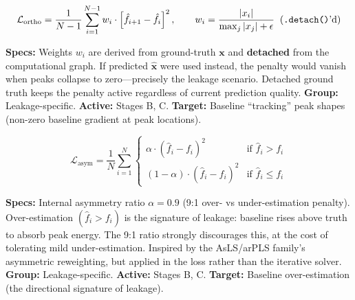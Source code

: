 \documentclass[11pt, letterpaper]{article}
\begin{document}
\vspace{0.3em}

\begin{questionbox}
\normalfont
$$
\mathcal{L}_{\text{ortho}} = \frac{1}{N-1}\sum_{i=1}^{N-1} w_i \cdot \left[\hat{f}_{i+1} - \hat{f}_i\right]^2, \qquad
w_i = \frac{|x_i|}{\max_j |x_j| + \epsilon} \;\;\text{(\texttt{.detach()}'d)}
$$
\end{questionbox}
\begin{answerbox}
\textbf{Specs:} Weights $w_i$ are derived from ground-truth $\mathbf{x}$ and \textbf{detached} from the
computational graph.  If predicted $\hat{\mathbf{x}}$ were used instead, the penalty would vanish when
peaks collapse to zero---precisely the leakage scenario.  Detached ground truth keeps the penalty active
regardless of current prediction quality.
\textbf{Group:} Leakage-specific.  \textbf{Active:} Stages B, C.
\textbf{Target:} Baseline ``tracking'' peak shapes (non-zero baseline gradient at peak locations).
\end{answerbox}

\vspace{0.3em}

\begin{questionbox}
\normalfont
$$
\mathcal{L}_{\text{asym}} = \frac{1}{N}\sum_{i=1}^{N}
\begin{cases}
    \alpha \cdot (\hat{f}_i - f_i)^2 & \text{if } \hat{f}_i > f_i \\
    (1 - \alpha) \cdot (\hat{f}_i - f_i)^2 & \text{if } \hat{f}_i \leq f_i
\end{cases}
$$
\end{questionbox}
\begin{answerbox}
\textbf{Specs:} Internal asymmetry ratio $\alpha = 0.9$ (9:1 over- vs under-estimation penalty).
Over-estimation $(\hat{f}_i > f_i)$ is the signature of leakage: baseline rises above truth to absorb
peak energy.  The 9:1 ratio strongly discourages this, at the cost of tolerating mild under-estimation.
Inspired by the AsLS/arPLS family's asymmetric reweighting, but applied in the loss rather than the
iterative solver.
\textbf{Group:} Leakage-specific.  \textbf{Active:} Stages B, C.
\textbf{Target:} Baseline over-estimation (the directional signature of leakage).
\end{answerbox}
\end{document}
